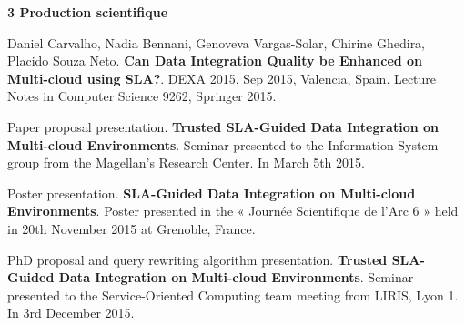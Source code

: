 \documentclass[11pt,a4paper,oneside]{report}
\begin{document}

\newpage
\begin{flushleft}
\textbf{3 Production scientifique}\\
\end{flushleft}

\noindent
Daniel Carvalho, Nadia Bennani, Genoveva Vargas-Solar, Chirine Ghedira, Placido Souza Neto. \textbf{Can Data Integration Quality be Enhanced on Multi-cloud using SLA?}. DEXA 2015, Sep 2015, Valencia, Spain. Lecture Notes in Computer Science 9262, Springer 2015.
\bigskip

\noindent
Paper proposal presentation. \textbf{Trusted SLA-Guided Data Integration on Multi-cloud Environments}. Seminar presented to the Information System group from the Magellan’s Research Center. In March 5th 2015.
\bigskip

%
%

\noindent
Poster presentation. \textbf{SLA-Guided Data Integration on Multi-cloud Environments}. Poster presented in the « Journée Scientifique de l'Arc 6 » held in 20th November 2015 at Grenoble, France. 
\bigskip

\noindent
PhD proposal and query rewriting algorithm presentation. \textbf{Trusted SLA-Guided Data Integration on Multi-cloud Environments}. Seminar presented to the Service-Oriented Computing team meeting from LIRIS, Lyon 1. In 3rd December 2015.
\bigskip
\end{document}
